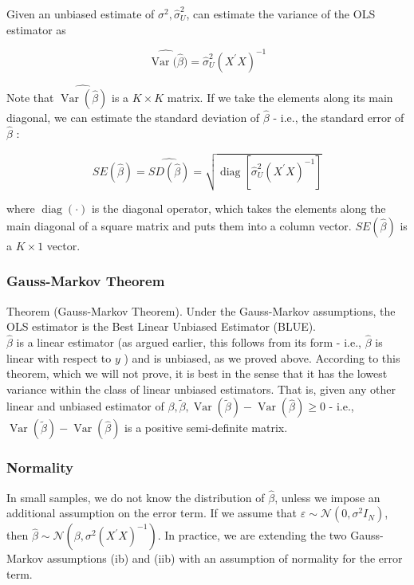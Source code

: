 Given an unbiased estimate of $\sigma^{2}, \widehat{\sigma}_{U}^{2}$, can estimate the variance of the OLS estimator as

$$
\widehat{\operatorname{Var}(\widehat{\beta}})=\widehat{\sigma}_{U}^{2}\left(X^{\prime} X\right)^{-1}
$$

Note that $\widehat{\operatorname{Var}(\widehat{\beta})}$ is a $K \times K$ matrix. If we take the elements along its main diagonal, we can estimate the standard deviation of $\widehat{\beta}$ - i.e., the standard error of $\widehat{\beta}$ :

$$
S E(\widehat{\beta})=\widehat{S D(\widehat{\beta})}=\sqrt{\operatorname{diag}\left[\widehat{\sigma}_{U}^{2}\left(X^{\prime} X\right)^{-1}\right]}
$$

where $\operatorname{diag}(\cdot)$ is the diagonal operator, which takes the elements along the main diagonal of a square matrix and puts them into a column vector. $S E(\widehat{\beta})$ is a $K \times 1$ vector.

\subsubsection{Gauss-Markov Theorem}
Theorem (Gauss-Markov Theorem). Under the Gauss-Markov assumptions, the OLS estimator is the Best Linear Unbiased Estimator (BLUE).\\
$\widehat{\beta}$ is a linear estimator (as argued earlier, this follows from its form - i.e., $\widehat{\beta}$ is linear with respect to $y$ ) and is unbiased, as we proved above. According to this theorem, which we will not prove, it is best in the sense that it has the lowest variance within the class of linear unbiased estimators. That is, given any other linear and unbiased estimator of $\beta, \tilde{\beta}, \operatorname{Var}(\tilde{\beta})-\operatorname{Var}(\widehat{\beta}) \geq 0$ - i.e., $\operatorname{Var}(\tilde{\beta})-\operatorname{Var}(\widehat{\beta})$ is a positive semi-definite matrix.

\subsubsection{Normality}
In small samples, we do not know the distribution of $\widehat{\beta}$, unless we impose an additional assumption on the error term. If we assume that $\varepsilon \sim \mathcal{N}\left(0, \sigma^{2} I_{N}\right)$, then $\widehat{\beta} \sim \mathcal{N}\left(\beta, \sigma^{2}\left(X^{\prime} X\right)^{-1}\right)$. In practice, we are extending the two Gauss-Markov assumptions (ib) and (iib) with an assumption of normality for the error term.

